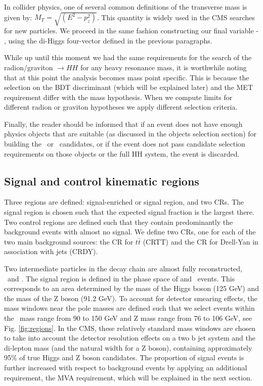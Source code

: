 In collider physics, one of several common definitions of the transverse mass is given by: $M_T=\sqrt{( E^2- p_z^2)}$. This quantity is widely used in the CMS searches for new particles. We proceed in the same fashion constructing our final variable - \mTHH, using the di-Higgs four-vector defined in the previous paragraphs. 

While up until this moment we had the same requirements for the search of the radion/graviton $\to HH$ for any heavy resonance mass, it is worthwhile noting that at this point the analysis becomes mass point specific. This is because the selection on the BDT discriminant (which will be explained later) and the MET requirement differ with the mass hypothesis. When we compute limits for different radion or graviton hypotheses we apply different selection criteria. 

Finally, the reader should be informed that if an event does not have enough physics objects that are suitable (as discussed in the objects selection section) for building the \Zll~or \HBB~candidates, or if the event does not pass candidate selection requirements on those objects or the full HH system, the event is discarded.

\subsection{Signal and control kinematic regions}

Three regions are defined: signal-enriched or signal region, and two CRs. The signal region is chosen such that the expected signal fraction is the largest there. Two control regions are defined such that they contain predominantly the background events with almost no signal. We define two CRs, one for each of the two main background sources: the CR for $t\bar{t}$ (CRTT) and the CR for Drell-Yan in association with jets (CRDY).

Two intermediate particles in the decay chain are almost fully reconstructed, \HBB~and \Zll. The signal region is defined in the phase space of \HBB and \Zll~events. This corresponds to an area determined by the mass of the Higgs boson (125 GeV) and the mass of the Z boson (91.2 GeV). To account for detector smearing effects, the mass windows near the pole masses are defined such that we select events within the \HBB~mass range from 90 to 150 GeV and Z mass range from 76 to 106 GeV, see Fig. \ref{fig:regions}. In the CMS, these relatively standard mass windows are chosen to take into account the detector resolution effects on a two b jet system and the di-lepton mass (and the natural width for a Z boson), containing approximately 95$\%$ of true Higgs and Z boson candidates. The proportion of signal events is further increased with respect to background events by applying an additional requirement, the MVA requirement, which will be explained in the next section.

